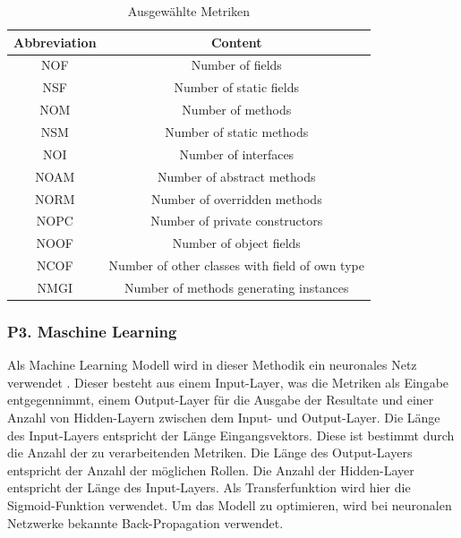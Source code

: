 \documentclass[conference]{IEEEtran}
\begin{document}
\begin{table}[h!]
    \begin{tabular}{ |c|c| }
        \hline
        Abbreviation & Content                                        \\
        \hline
        NOF          & Number of fields                               \\
        \hline
        NSF          & Number of static fields                        \\
        \hline
        NOM          & Number of methods                              \\
        \hline
        NSM          & Number of static methods                       \\
        \hline
        NOI          & Number of interfaces                           \\
        \hline
        NOAM         & Number of abstract methods                     \\
        \hline
        NORM         & Number of overridden methods                   \\
        \hline
        NOPC         & Number of private constructors                 \\
        \hline
        NOOF         & Number of object fields                        \\
        \hline
        NCOF         & Number of other classes with field of own type \\
        \hline
        NMGI         & Number of methods generating instances         \\
        \hline
    \end{tabular}
    \caption{Ausgewählte Metriken}
    \label{tabel:1}
\end{table}


\subsubsection*{P3. Maschine Learning}

Als Machine Learning Modell wird in dieser Methodik ein neuronales Netz verwendet \cite[p. 5]{dodmetrics}. Dieser besteht aus einem Input-Layer, was die Metriken als Eingabe entgegennimmt, einem Output-Layer für die Ausgabe der Resultate und einer Anzahl von Hidden-Layern zwischen dem Input- und Output-Layer.
Die Länge des Input-Layers entspricht der Länge Eingangsvektors. Diese ist bestimmt durch die Anzahl der zu verarbeitenden Metriken. Die Länge des Output-Layers entspricht der Anzahl der möglichen Rollen.
Die Anzahl der Hidden-Layer entspricht der Länge des Input-Layers. Als Transferfunktion wird hier die Sigmoid-Funktion verwendet.
Um das Modell zu optimieren, wird bei neuronalen Netzwerke bekannte Back-Propagation verwendet.
\end{document}
